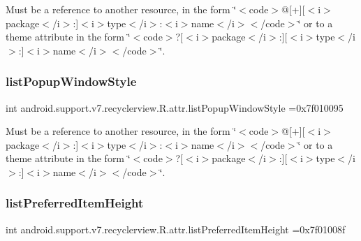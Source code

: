 Must be a reference to another resource, in the form \char`\"{}$<$code$>$@\mbox{[}+\mbox{]}\mbox{[}$<$i$>$package$<$/i$>$\+:\mbox{]}$<$i$>$type$<$/i$>$\+:$<$i$>$name$<$/i$>$$<$/code$>$\char`\"{} or to a theme attribute in the form \char`\"{}$<$code$>$?\mbox{[}$<$i$>$package$<$/i$>$\+:\mbox{]}\mbox{[}$<$i$>$type$<$/i$>$\+:\mbox{]}$<$i$>$name$<$/i$>$$<$/code$>$\char`\"{}. \mbox{\label{classandroid_1_1support_1_1v7_1_1recyclerview_1_1R_1_1attr_ae5eeee2a9b29dee74be84c72c3d62f9e}} 
\subsubsection{\texorpdfstring{list\+Popup\+Window\+Style}{listPopupWindowStyle}}
{\footnotesize\ttfamily int android.\+support.\+v7.\+recyclerview.\+R.\+attr.\+list\+Popup\+Window\+Style =0x7f010095\hspace{0.3cm}{\ttfamily [static]}}

Must be a reference to another resource, in the form \char`\"{}$<$code$>$@\mbox{[}+\mbox{]}\mbox{[}$<$i$>$package$<$/i$>$\+:\mbox{]}$<$i$>$type$<$/i$>$\+:$<$i$>$name$<$/i$>$$<$/code$>$\char`\"{} or to a theme attribute in the form \char`\"{}$<$code$>$?\mbox{[}$<$i$>$package$<$/i$>$\+:\mbox{]}\mbox{[}$<$i$>$type$<$/i$>$\+:\mbox{]}$<$i$>$name$<$/i$>$$<$/code$>$\char`\"{}. \mbox{\label{classandroid_1_1support_1_1v7_1_1recyclerview_1_1R_1_1attr_a197263355ceadf89a488e2fd799f74c5}} 
\subsubsection{\texorpdfstring{list\+Preferred\+Item\+Height}{listPreferredItemHeight}}
{\footnotesize\ttfamily int android.\+support.\+v7.\+recyclerview.\+R.\+attr.\+list\+Preferred\+Item\+Height =0x7f01008f\hspace{0.3cm}{\ttfamily [static]}}

